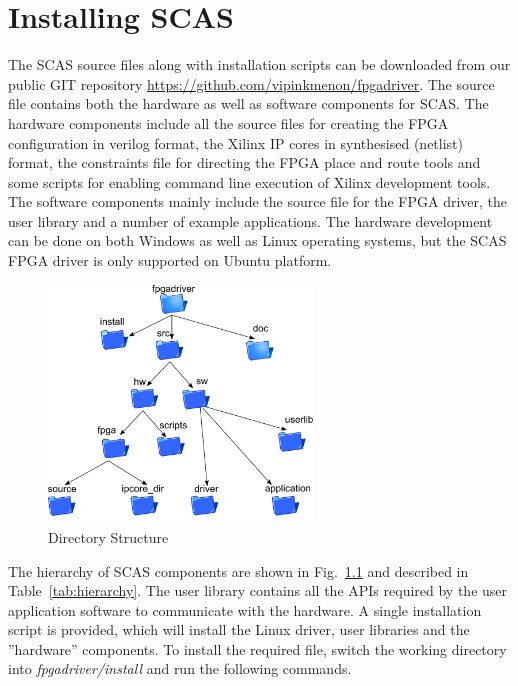 \chapter{Installing SCAS}
\label{chap_installation}

The SCAS source files along with installation scripts can be downloaded from our public GIT repository \url{https://github.com/vipinkmenon/fpgadriver}.
The source file contains both the hardware as well as software components for SCAS.
The hardware components include all the source files for creating the FPGA configuration in verilog format, the Xilinx IP cores in synthesised (netlist) format, the constraints file for directing the FPGA place and route tools and some scripts for enabling command line execution of Xilinx development tools.
The software components mainly include the source file for the FPGA driver, the user library and a number of example applications.
The hardware development can be done on both Windows as well as Linux operating systems, but the SCAS FPGA driver is only supported on Ubuntu platform.

\begin{figure}[h]
\centering
\includegraphics[width=7cm]{figures/inst_hierarchy.pdf}
\caption{Directory Structure}
\label{inst_hierarchy}
\end{figure}

\noindent The hierarchy of SCAS components are shown in Fig.~\ref{inst_hierarchy} and described in Table~\ref{tab:hierarchy}.
The user library contains all the APIs required by the user application software to communicate with the hardware.
A single installation script is provided, which will install the Linux driver, user libraries and the ''hardware'' components.
To install the required file, switch the working directory into \emph{fpgadriver/install} and run the following commands.\\

\\
\\

